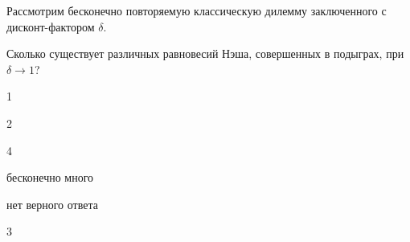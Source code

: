 
\begin{question}
Рассмотрим бесконечно повторяемую классическую дилемму заключенного с дисконт-фактором \(\delta\).

Сколько существует различных равновесий Нэша, совершенных в подыграх, при \(\delta \to 1\)?
\begin{answerlist}
  \item 1
  \item 2
  \item 4
  \item бесконечно много
  \item нет верного ответа
  \item 3
\end{answerlist}
\end{question}


